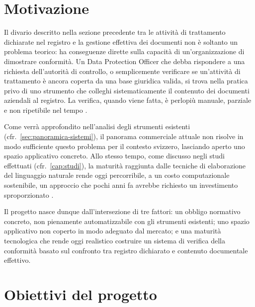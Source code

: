 \section{Motivazione}
\label{sec:motivazione}
Il divario descritto nella sezione precedente tra le attività di trattamento dichiarate nel registro e la gestione effettiva dei documenti non è soltanto un problema teorico: ha conseguenze dirette sulla capacità di un'organizzazione di dimostrare conformità. Un Data Protection Officer che debba rispondere a una richiesta dell'autorità di controllo, o semplicemente verificare se un'attività di trattamento è ancora coperta da una base giuridica valida, si trova nella pratica privo di uno strumento che colleghi sistematicamente il contenuto dei documenti aziendali al registro. La verifica, quando viene fatta, è perlopiù manuale, parziale e non ripetibile nel tempo \cite{amaralNLPbasedAutomatedCompliance2023}. \medskip

Come verrà approfondito nell'analisi degli strumenti esistenti (cfr.~\ref{sec:panoramica-sistemi}), il panorama commerciale attuale non risolve in modo sufficiente questo problema per il contesto svizzero, lasciando aperto uno spazio applicativo concreto. Allo stesso tempo, come discusso negli studi effettuati (cfr.~\ref{cap:studi}), la maturità raggiunta dalle tecniche di elaborazione del linguaggio naturale rende oggi percorribile, a un costo computazionale sostenibile, un approccio che pochi anni fa avrebbe richiesto un investimento sproporzionato \cite{lu2024slmsurvey, malakhov2026cpullm}. \medskip

Il progetto nasce dunque dall'intersezione di tre fattori: un obbligo normativo concreto, non pienamente automatizzabile con gli strumenti esistenti; uno spazio applicativo non coperto in modo adeguato dal mercato; e una maturità tecnologica che rende oggi realistico costruire un sistema di verifica della conformità basato sul confronto tra registro dichiarato e contenuto documentale effettivo.

\section{Obiettivi del progetto}
\label{sec:obiettivi}

